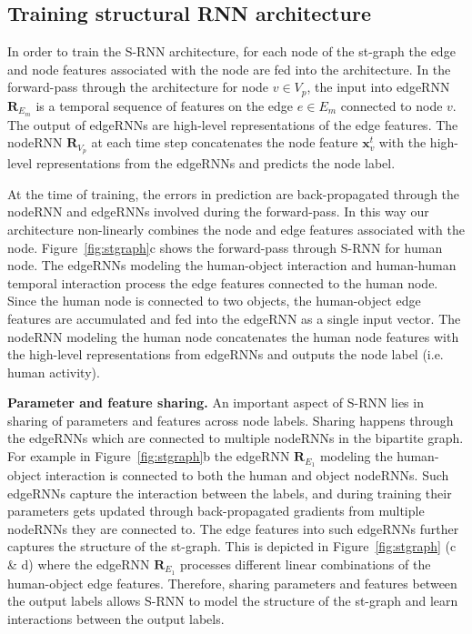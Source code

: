 \documentclass[10pt,twocolumn,letterpaper]{article}
\newcommand{\ve}[1]{\mathbf{#1}}
\begin{document}
\subsection{Training structural RNN architecture}

In order to train the S-RNN architecture, for each node of the st-graph the edge and node features associated with the node are fed into the architecture.  In the forward-pass through the architecture for node $v \in V_p$, the input into edgeRNN $\ve{R}_{E_m}$ is a temporal sequence of features on the edge $e \in E_m$ connected to node $v$. The output of edgeRNNs are high-level representations of the edge features.  The nodeRNN $\ve{R}_{V_p}$ at each time step  concatenates the node feature $\ve{x}_v^t$ with the high-level representations from the edgeRNNs and predicts the node label. 

At the time of training, the errors in prediction are back-propagated through the nodeRNN and edgeRNNs involved during the forward-pass. In this way our architecture non-linearly combines the node and edge features associated with the node.  Figure~\ref{fig:stgraph}c shows the forward-pass through S-RNN for human node. The edgeRNNs modeling the human-object interaction and human-human temporal interaction process the edge features connected to the human node. Since the human node is connected to two objects, the human-object edge features are accumulated and fed into the edgeRNN as a single input vector. The nodeRNN modeling the human node concatenates the human node features with the high-level representations from edgeRNNs and outputs the node label (i.e. human activity).

\textbf{Parameter and feature sharing.} An important aspect of S-RNN lies in sharing of parameters and features across node labels. Sharing happens through the edgeRNNs which are connected to multiple nodeRNNs in the bipartite graph. For example in Figure~\ref{fig:stgraph}b the edgeRNN $\ve{R}_{E_1}$ modeling the human-object interaction is connected to both the human and object nodeRNNs. Such edgeRNNs capture the interaction between the labels, and during training their parameters gets updated through back-propagated gradients from multiple nodeRNNs they are connected to. The edge features into such edgeRNNs further captures the structure of the st-graph. This is depicted in Figure~\ref{fig:stgraph} (c \& d) where the edgeRNN $\ve{R}_{E_1}$ processes different linear combinations of the human-object edge features. Therefore, sharing parameters and features between the output labels allows S-RNN to model the structure of the st-graph and learn interactions between the output labels.
\end{document}
